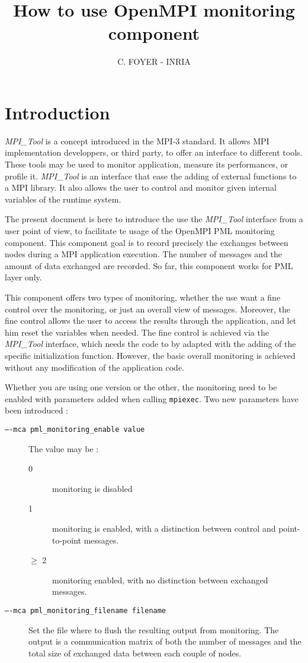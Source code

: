 \documentclass[notitlepage]{article}
\title{How to use OpenMPI monitoring component}
\author{C. FOYER - INRIA}
\newcommand{\mpit}[1]{\textit{MPI\_Tool#1}}
\begin{document}
\maketitle

\section{Introduction}

\mpit{} is a concept introduced in the MPI-3 standard. It allows MPI
implementation developpers, or third party, to offer an interface to
different tools. These tools may be used to monitor application,
measure its performances, or profile it. \mpit{} is an interface that
ease the adding of external functions to a MPI library. It also allows
the user to control and monitor given internal variables of the
runtime system.

The present document is here to introduce the use the \mpit{}
interface from a user point of view, to facilitate te usage of the
OpenMPI PML monitoring component. This component goal is to record
precisely the exchanges between nodes during a MPI application
execution. The number of messages and the amount of data exchanged are
recorded. So far, this component works for PML layer only.

This component offers two types of monitoring, whether the use want a
fine control over the monitoring, or just an overall view of
messages. Moreover, the fine control allows the user to access the
results through the application, and let him reset the variables when
needed. The fine control is achieved via the \mpit{} interface, which
needs the code to by adapted with the adding of the specific
initialization function. However, the basic overall monitoring is
achieved without any modification of the application code.

Whether you are using one version or the other, the monitoring need to
be enabled with parameters added when calling \texttt{mpiexec}. Two new
parameters have been introduced :
\begin{description}
\item [\texttt{----mca pml\_monitoring\_enable value}] The value may be :
  \begin{description}
  \item [0] monitoring is disabled
  \item [1] monitoring is enabled, with a distinction between control
    and point-to-point messages.
  \item [$\ge$ 2] monitoring enabled, with no distinction between
    exchanged messages.
  \end{description}
\item [\texttt{----mca pml\_monitoring\_filename filename}] Set the file
  where to flush the resulting output from monitoring. The output is a
  communication matrix of both the number of messages and the total
  size of exchanged data between each couple of nodes.
\end{description}
\end{document}
